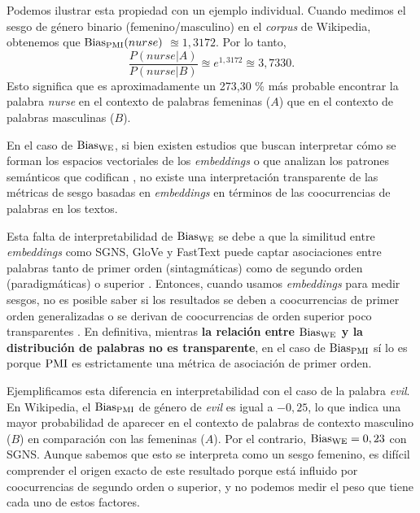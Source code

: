 Podemos ilustrar esta propiedad con un ejemplo individual. Cuando medimos el sesgo de género binario (femenino/masculino) en el \emph{corpus} de Wikipedia, obtenemos que $\operatorname{Bias_{PMI}}(nurse)$ $\approxeq
1,3172$. Por lo tanto,
%
\begin{equation*}
    \frac{P(nurse|A)}{P(nurse|B)} \approxeq
    e^{1,3172} \approxeq
    3,7330.
\end{equation*}
%
Esto significa que es aproximadamente un 273,30 \% más probable encontrar la palabra \emph{nurse} en el contexto de palabras femeninas ($A$) que en el contexto de palabras masculinas ($B$).

En el caso de $\operatorname{Bias_{WE}}$, si bien existen estudios que buscan interpretar cómo se forman los espacios vectoriales de los \emph{embeddings} \citep{levy2014neural,levy2015improving,ethayarajh2019understanding} o que analizan los patrones semánticos que codifican \citep{bolukbasi2016man,zhao2017men,gonen2019lipstick}, no existe una interpretación transparente de las métricas de sesgo basadas en \emph{embeddings} en términos de las coocurrencias de palabras en los textos.

Esta falta de interpretabilidad de $\operatorname{Bias_{WE}}$ se debe a que la similitud entre \emph{embeddings} como SGNS, GloVe y FastText puede captar asociaciones entre palabras tanto de primer orden (sintagmáticas) como de segundo orden (paradigmáticas) o superior \citep{altszyler2018corpus,schlechtweg2019second}. Entonces, cuando usamos \emph{embeddings} para medir sesgos, no es posible saber si los resultados se deben a coocurrencias de primer orden generalizadas o se derivan de coocurrencias de orden superior poco transparentes \citep{brunet2019understanding,rekabsaz2021measuring}. En definitiva, mientras \textbf{la relación entre $\operatorname{Bias_{WE}}$ y la distribución de palabras no es transparente}, en el caso de $\operatorname{Bias_{PMI}}$ sí lo es porque $\operatorname{PMI}$ es estrictamente una métrica de asociación de primer orden.


Ejemplificamos esta diferencia en interpretabilidad con el caso de la palabra \emph{evil}. En Wikipedia, el $\operatorname{Bias_{PMI}}$ de género de \emph{evil} es igual a $-0,25$, lo que indica una mayor probabilidad de aparecer en el contexto de palabras de contexto masculino ($B$) en comparación con las femeninas ($A$). Por el contrario, $\operatorname{Bias_{WE}}=0,23$ con SGNS. Aunque sabemos que esto se interpreta como un sesgo femenino, es difícil comprender el origen exacto de este resultado porque está influido por coocurrencias de segundo orden o superior, y no podemos medir el peso que tiene cada uno de estos factores. 

